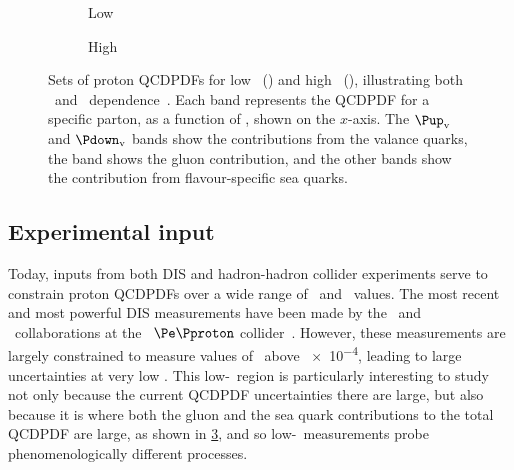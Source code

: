
\begin{figure}
  \begin{subfigure}[b]{0.5\textwidth}
    \centering
    
    \caption{Low \pdfqsquared}
    \label{fig:prod:theory:pdf_sets:low_qsquared}
  \end{subfigure}
  \begin{subfigure}[b]{0.5\textwidth}
    \centering
    
    \caption{High \pdfqsquared}
    \label{fig:prod:theory:pdf_sets:high_qsquared}
  \end{subfigure}
  \caption{%
    Sets of proton \aclp{QCDPDF} for low \pdfqsquared\ 
    () and high \pdfqsquared\ 
    (), illustrating both 
    \bjorkenx\ and \pdfqsquared\ dependence~\cite{PDG2014}.
    Each band represents the \ac{QCDPDF} for a specific parton, as a function 
    of \bjorkenx, shown on the $x$-axis.
    The $\Pup_{\text{v}}$ and $\Pdown_{\text{v}}$ bands show the contributions 
    from the valance quarks, the \Pgluon band shows the gluon contribution, and 
    the other bands show the contribution from flavour-specific sea quarks.
  }
  \label{fig:prod:theory:pdf_sets}
\end{figure}

\subsection{Experimental input}
\label{chap:prod:theory:pdfs:inputs}

Today, inputs from both \ac{DIS} and hadron-hadron collider experiments serve 
to constrain proton \acp{QCDPDF} over a wide range of \bjorkenx\ and 
\pdfqsquared\ values.
The most recent and most powerful \ac{DIS} measurements have been made by the 
\hone\ and \zeus\ collaborations at the \hera\ $\Pe\Pproton$ 
collider~\cite{Abramowicz:1900rp}.
However, these measurements are largely constrained to measure values of 
\bjorkenx\ above \num{e-4}, leading to large uncertainties at very low 
\bjorkenx.
This low-\bjorkenx\ region is particularly interesting to study not only 
because the current \ac{QCDPDF} uncertainties there are large, but also because 
it is where both the gluon and the sea quark contributions to the total 
\ac{QCDPDF} are large, as shown in \cref{fig:prod:theory:pdf_sets}, and so 
low-\bjorkenx\ measurements probe phenomenologically different processes.

